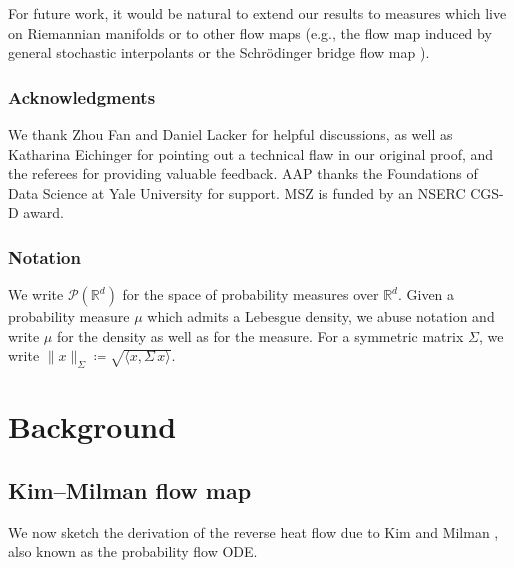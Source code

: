 \documentclass[12pt]{article}
\newcommand{\cP}{\mathcal{P}}
\newcommand{\RR}{\mathbb{R}}
\newcommand{\R}{\RR}
\newcommand{\1}{\mathds{1}}
\newcommand{\deq}{\coloneqq}
\theoremstyle{plain}
\theoremstyle{definition}
\theoremstyle{remark}
\begin{document}
{For future work, it would be natural to extend our results to measures which live on Riemannian manifolds \cite{fathi2024transportation} or to other flow maps (e.g., the flow map induced by general stochastic interpolants \cite{Lip+23FlowMatching, AlbBofVan25StochInterpolants} or the Schr\"odinger bridge flow map  \cite{Leo14Schrodinger, shi2023diffusion, PooNil25SB}).}

\subsubsection*{Acknowledgments}
We thank Zhou Fan and Daniel Lacker for helpful discussions{, as well as Katharina Eichinger for pointing out a technical flaw in our original proof, and the referees for providing valuable feedback}. AAP thanks the Foundations of Data Science at Yale University for support. MSZ is funded by an NSERC CGS-D award.

\subsubsection*{Notation}

We write $\cP(\R^d)$ for the space of probability measures over $\R^d$.
Given a probability measure $\mu$ which admits a Lebesgue density, we abuse notation and write $\mu$ for the density as well as for the measure.
For a symmetric matrix $\Sigma$, we write $\|x\|_\Sigma \deq \sqrt{\langle x, \Sigma\,x\rangle}$.

\section{Background}\label{sec:background}
\subsection{{Kim--Milman flow map}}\label{sec:pfode_bg}
We now {sketch the derivation of the reverse heat flow due to Kim and Milman \cite{kim2012generalization}, also known as the probability flow ODE}.
\end{document}
